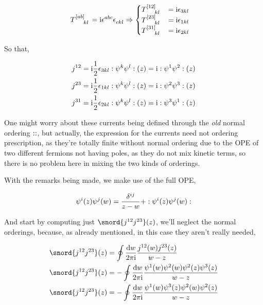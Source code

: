 \begin{align*}
    \tensor{T}{^{\qty[ab]}_k_l}&=\im\tensor{\epsilon}{^a^b^c}\tensor{\epsilon}{_c_k_l}\Rightarrow\begin{cases}
        \tensor{T}{^{\qty[12]}_k_l}&=\im\epsilon_{3kl}\\
        \tensor{T}{^{\qty[23]}_k_l}&=\im\epsilon_{1kl}\\
        \tensor{T}{^{\qty[31]}_k_l}&=\im\epsilon_{2kl}
    \end{cases}
\end{align*}

So that,

\begin{align*}
    j^{12}&=\textnormal{i}\frac1 2\epsilon_{3kl}:\psi^k\psi^l:\qty(z)=\textnormal{i}:\psi^1\psi^2:\qty(z)\\
    j^{23}&=\textnormal{i}\frac1 2\epsilon_{1kl}:\psi^k\psi^l:\qty(z)=\textnormal{i}:\psi^2\psi^3:\qty(z)\\
    j^{31}&=\textnormal{i}\frac1 2\epsilon_{2kl}:\psi^k\psi^l:\qty(z)=\textnormal{i}:\psi^3\psi^1:\qty(z)
\end{align*}

One might worry about these currents being defined through the \textit{old} normal ordering $::$, but actually, the expression 
for the currents need not ordering prescription, as they're totally finite without normal ordering due to the OPE of two different fermions 
not having poles, as they do not mix kinetic terms, so there is no problem here in mixing the two kinds of orderings.

\probitem{}

With the remarks being made, we make use of the full OPE,

\begin{align*}
    \psi^i\qty(z)\psi^j\qty(w)=\frac{\delta^{ij}}{z-w}+:\psi^i\qty(z)\psi^j\qty(w):
\end{align*}

And start by computing just $\snord{j^{12}j^{23}}\qty(z)$, we'll neglect the normal orderings, because, as already 
mentioned, in this case they aren't really needed,

\begin{align*}
    \snord{j^{12}j^{23}}\qty(z)&=\oint\frac{\dd{w}}{2\pi\im}\frac{j^{12}\qty(w)j^{23}\qty(z)}{w-z}\\
    \snord{j^{12}j^{23}}\qty(z)&=-\oint\frac{\dd{w}}{2\pi\im}\frac{\psi^1\qty(w)\psi^2\qty(w)\psi^2\qty(z)\psi^3\qty(z)}{w-z}\\
    \snord{j^{12}j^{23}}\qty(z)&=-\oint\frac{\dd{w}}{2\pi\im}\frac{\psi^1\qty(w)\psi^3\qty(z)\psi^2\qty(w)\psi^2\qty(z)}{w-z}
\end{align*}

